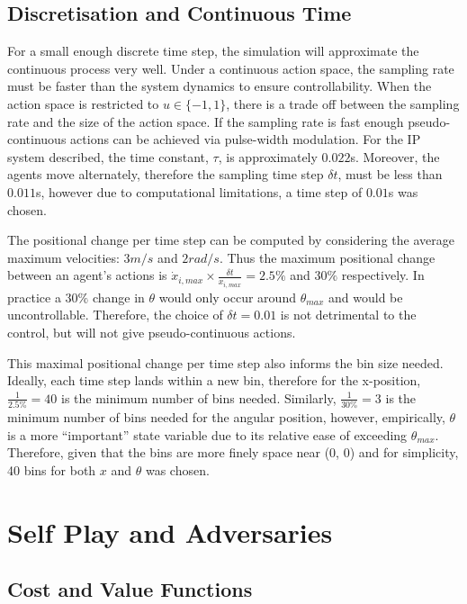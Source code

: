 \documentclass[../main.tex]{subfiles}
\begin{document}
\subsection{Discretisation and Continuous Time}

For a small enough discrete time step, the simulation will approximate the continuous process very well. Under a continuous action space, the sampling rate must be faster than the system dynamics to ensure controllability. When the action space is restricted to $u \in \{-1, 1\}$, there is a trade off between the sampling rate and the size of the action space. If the sampling rate is fast enough pseudo-continuous actions can be achieved via pulse-width modulation. For the IP system described, the time constant, $\tau$, is approximately $0.022$s. Moreover, the agents move alternately, therefore the sampling time step $ \delta t$, must be  less than  $0.011$s, however due to computational limitations, a time step of $0.01$s was chosen.

The positional change per time step can be computed by considering the average maximum velocities: $3m/s$ and $2rad/s$. Thus the maximum positional change between an agent's actions is $\dot{x}_{i, max} \times \frac{\delta t}{x_{i, max}} = 2.5\%$ and $30\%$ respectively. In practice a $30\%$ change in $\theta$ would only occur around $\theta_{max}$ and would be uncontrollable. Therefore, the choice of $\delta t = 0.01$ is not detrimental to the control, but will not give pseudo-continuous actions.

This maximal positional change per time step also informs the bin size needed. Ideally, each time step lands within a new bin, therefore for the x-position, $\frac{1}{2.5\%} = 40$ is the minimum number of bins needed. Similarly, $\frac{1}{30\%} = 3$ is the minimum number of bins needed for the angular position, however, empirically, $\theta$ is a more ``important'' state variable due to its relative ease of exceeding $\theta_{max}$. Therefore, given that the bins are more finely space near (0, 0) and for simplicity, 40 bins for both $x$ and $\theta$ was chosen.

\section{Self Play and Adversaries}

\subsection{Cost and Value Functions}
\end{document}
